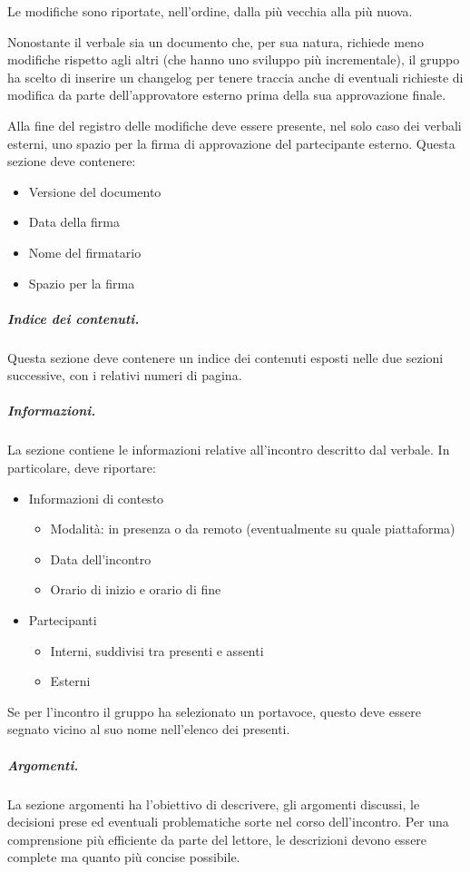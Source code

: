 Le modifiche sono riportate, nell'ordine, dalla più vecchia alla più nuova.
\par Nonostante il verbale sia un documento che, per sua natura, richiede meno modifiche rispetto agli altri (che hanno uno sviluppo più incrementale), il gruppo ha scelto di inserire un changelog per tenere traccia anche di eventuali richieste di modifica da parte dell'approvatore esterno prima della sua approvazione finale.
\par Alla fine del registro delle modifiche deve essere presente, nel solo caso dei verbali esterni, uno spazio per la firma di approvazione del partecipante esterno. Questa sezione deve contenere:
\begin{itemize}
    \item Versione del documento
    \item Data della firma
    \item Nome del firmatario
    \item Spazio per la firma
\end{itemize}
\subparagraph{Indice dei contenuti.}
Questa sezione deve contenere un indice dei contenuti esposti nelle due sezioni successive, con i relativi numeri di pagina.
\subparagraph{Informazioni.}
La sezione contiene le informazioni relative all'incontro descritto dal verbale. In particolare, deve riportare:
\begin{itemize}
    \item Informazioni di contesto
    \begin{itemize}
        \item Modalità: in presenza o da remoto (eventualmente su quale piattaforma)
        \item Data dell'incontro
        \item Orario di inizio e orario di fine
    \end{itemize}
    \item Partecipanti
    \begin{itemize}
        \item Interni, suddivisi tra presenti e assenti
        \item Esterni
    \end{itemize}
\end{itemize}
Se per l'incontro il gruppo ha selezionato un portavoce, questo deve essere segnato vicino al suo nome nell'elenco dei presenti.
\subparagraph{Argomenti.}
La sezione argomenti ha l'obiettivo di descrivere, gli argomenti discussi, le decisioni prese ed eventuali problematiche sorte nel corso dell'incontro. Per una comprensione più efficiente da parte del lettore, le descrizioni devono essere complete ma quanto più concise possibile.
